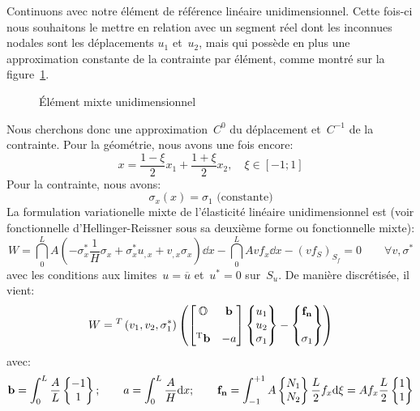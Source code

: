 Continuons avec notre élément de référence linéaire unidimensionnel. Cette fois-ci nous souhaitons
le mettre en relation avec un segment réel dont les inconnues nodales sont les déplacements
$u_1$ et~$u_2$, mais qui possède en plus une approximation constante de la contrainte
par élément, comme montré sur la figure~\ref{fig-ex2mixte}.
\begin{figure}[ht]\centering
{} \hspace{5 em}
\caption{Élément mixte unidimensionnel}\label{fig-ex2mixte}
\end{figure}
\medskipvm
Nous cherchons donc une approximation~$C^0$ du déplacement et~$C^{-1}$ de la
contrainte.
\medskipvm
Pour la géométrie, nous avons une fois encore:
\begin{equation} x=\frac{1-\xi}2 x_1 + \frac{1+\xi}2 x_2, \quad \xi\in[-1;1] \end{equation}
\medskipvm
Pour la contrainte, nous avons:
\begin{equation} \sigma_x(x)=\sigma_1 \text{ (constante)} \end{equation}
\medskipvm
La formulation variationelle mixte de l'élasticité linéaire unidimensionnel est (voir fonctionnelle
d'Hellinger-Reissner sous sa deuxième forme ou fonctionnelle mixte):
\begin{equation}
W=\dint_0^L A\left(-\sigma_x^*\frac1H\sigma_x+\sigma_x^*u_{,x}+v_{,x}\sigma_x\right) \dd x
-\dint_0^L Avf_x \dd x - (v f_S)_{S_f} = 0\qquad \forall v,\sigma^*
\end{equation}
avec les conditions aux limites~$u=\overline{u}$ et~$u^*=0$ sur~$S_u$.
\medskipvm
De manière discrétisée, il vient:
\begin{equation}
W = \LLL{v_1, v_2, \sigma_1^*}\left(
\MM*{\mO & \VV{b}\\ ~\\ \LL{b} & -a}
\VV*{u_1\\u_2\\ \sigma_1}
- \VV*{\VV{f_n}\\~\\ \sigma_1}
\right)\end{equation}
avec:
\begin{equation}
\VV{b}=\dint_0^L \frac{A}L \VV*{-1\\1}; \qquad
a=\dint_0^L \frac{A}H \dd x; \qquad
\VV{f_n} = \dint_{-1}^{+1} A \VV*{N_1\\N_2} \frac{L}2 f_x \dd\xi =
 A f_x \frac{L}2 \VV*{1\\1}
\end{equation}
